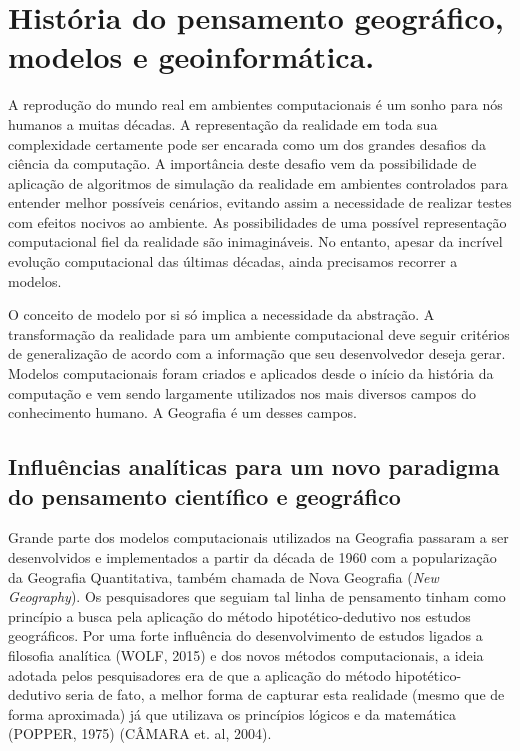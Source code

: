 \chapter{História do pensamento geográfico, modelos e geoinformática.}
A reprodução do mundo real em ambientes computacionais é um sonho para nós humanos a muitas décadas. A representação da realidade em toda sua complexidade certamente pode ser encarada como um dos grandes desafios da ciência da computação. A importância deste desafio vem da possibilidade de aplicação de algoritmos de simulação da realidade em ambientes controlados para entender melhor possíveis cenários, evitando assim a necessidade de realizar testes com efeitos nocivos ao ambiente. As possibilidades de uma possível representação computacional fiel da realidade são inimagináveis. No entanto, apesar da incrível evolução computacional das últimas décadas, ainda precisamos recorrer a modelos.

O conceito de modelo por si só implica a necessidade da abstração. A transformação da realidade para um ambiente computacional deve seguir critérios de generalização de acordo com a informação que seu desenvolvedor deseja gerar. Modelos computacionais foram criados e aplicados desde o início da história da computação e vem sendo largamente utilizados nos mais diversos campos do conhecimento humano. A Geografia é um desses campos. 

\section{Influências analíticas para um novo paradigma do pensamento científico e geográfico}
Grande parte dos modelos computacionais utilizados na Geografia passaram a ser desenvolvidos e implementados a partir da década de 1960 com a popularização da Geografia Quantitativa, também chamada de Nova Geografia (\textit{New Geography}). Os pesquisadores que seguiam tal linha de pensamento tinham como princípio a busca pela aplicação do método hipotético-dedutivo nos estudos geográficos. Por uma forte influência do desenvolvimento de estudos ligados a filosofia analítica (WOLF, 2015) e dos novos métodos computacionais, a ideia adotada pelos pesquisadores era de que a aplicação do método hipotético-dedutivo seria de fato, a melhor forma de capturar esta realidade (mesmo que de forma aproximada) já que utilizava os princípios lógicos e da matemática (POPPER, 1975) (CÂMARA et. al, 2004).

